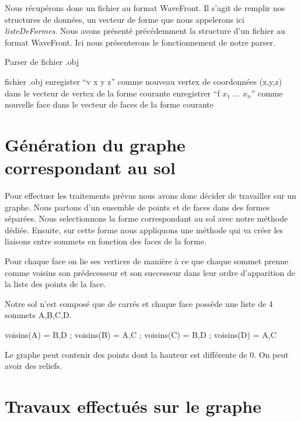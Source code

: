 \documentclass[a4paper,12pt]{report}
\begin{document}
Nous récupérons donc un fichier au format WaveFront. Il s'agit de remplir nos structures de données, un vecteur de forme que nous appelerons ici \textit{listeDeFormes}.
Nous avons présenté précédemment la structure d'un fichier au format WaveFront. Ici nous présenterons le fonctionnement de notre parser.

\begin{algorithm}[h]
\caption{Parser de fichier .obj}
\label{parser}
\begin{algorithmic}[1]
\REQUIRE fichier .obj
    \STATE enregister ``v x y z'' comme nouveau vertex de coordonnées (x,y,z) dans le vecteur de vertex de la forme courante
  \ELSE
    \STATE enregistrer ``f $x_{1}$ ... $x_{n}$'' comme nouvelle face dans le vecteur de faces de la forme courante
    \ENDIF
  \ENDIF
\ENDFOR
\end{algorithmic}
\end{algorithm}

\section{Génération du graphe correspondant au sol}

Pour effectuer les traitements prévus nous avons donc décider de travailler sur un graphe. Nous partons d'un ensemble de points et de faces dans des formes séparées. Nous selectionnons la forme correspondant au sol avec notre méthode dédiée. Ensuite, sur cette forme nous appliquons une méthode qui va créer les liaisons entre sommets en fonction des faces de la forme. 

Pour chaque face on lie ses vertices de manière à ce que chaque sommet prenne comme voisins son prédecesseur et son successeur dans leur ordre d'apparition de la liste des points de la face.

Notre sol n'est composé que de carrés et chaque face possède une liste de 4 sommets A,B,C,D.

voisins(A) = {B,D} ;  voisins(B) = {A,C} ; voisins(C) = {B,D} ; voisins(D) = {A,C}

Le graphe peut contenir des points dont la hauteur est différente de 0. On peut avoir des reliefs.


\section{Travaux effectués sur le graphe}
\end{document}

